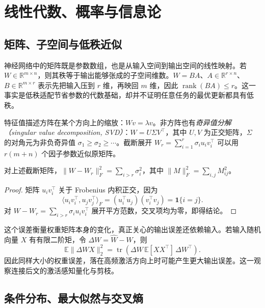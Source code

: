 \setcounter{chapter}{1} %
\chapter{线性代数、概率与信息论}
\label{ch:probability}

\section{矩阵、子空间与低秩近似}

神经网络中的矩阵既是参数数组，也是从输入空间到输出空间的线性映射。若 $W\in\mathbb R^{m\times n}$，则其秩等于输出能够张成的子空间维数。$W=BA$、$A\in\mathbb R^{r\times n}$、$B\in\mathbb R^{m\times r}$ 表示先把输入压到 $r$ 维，再映回 $m$ 维，因此 $\operatorname{rank}(BA)\le r$。这一事实是低秩适配节省参数的代数基础，却并不证明任意任务的最优更新都具有低秩。

特征值描述方阵在某个方向上的缩放：$Wv=\lambda v$。非方阵也有\emph{奇异值分解（singular value decomposition, SVD）}：$W=U\Sigma V^\top$，其中 $U,V$ 为正交矩阵，$\Sigma$ 的对角元为非负奇异值 $\sigma_1\ge\sigma_2\ge\cdots$。截断展开 $W_r=\sum_{i=1}^r\sigma_i u_iv_i^\top$ 可以用 $r(m+n)$ 个因子参数近似原矩阵。

\begin{proposition}
\label{prop:svd-error}
对上述截断矩阵，$\|W-W_r\|_F^2=\sum_{i>r}\sigma_i^2$，其中 $\|M\|_F^2=\sum_{i,j}M_{ij}^2$。
\end{proposition}
\begin{proof}
矩阵 $u_iv_i^\top$ 关于 Frobenius 内积正交，因为
\[
\langle u_iv_i^\top,u_jv_j^\top\rangle_F
=(u_i^\top u_j)(v_i^\top v_j)=\mathbf 1\{i=j\}.
\]
对 $W-W_r=\sum_{i>r}\sigma_i u_iv_i^\top$ 展开平方范数，交叉项均为零，即得结论。
\end{proof}

这个误差衡量权重矩阵本身的变化，真正关心的输出误差还依赖输入。若输入随机向量 $X$ 有有限二阶矩，令 $\Delta W=\widehat W-W$，则
\begin{equation}
\mathbb E\|\Delta W X\|_2^2
=\operatorname{tr}\!\left(\Delta W\,\mathbb E[XX^\top]\,\Delta W^\top\right).
\label{eq:activation-error}
\end{equation}
因此同样大小的权重误差，落在高频激活方向上时可能产生更大输出误差。这一观察连接后文的激活感知量化与剪枝。

\section{条件分布、最大似然与交叉熵}

